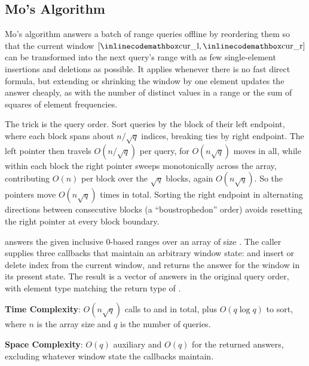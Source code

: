 \subsection{Mo's Algorithm}
\label{sec:2.5.4}
Mo's algorithm answers a batch of range queries offline by reordering them so that the current window $[{\inlinecodemath{cur\_l}}, {\inlinecodemath{cur\_r}}]$ can be transformed into the next query's range with as few single-element insertions and deletions as possible. It applies whenever there is no fast direct formula, but extending or shrinking the window by one element updates the answer cheaply, as with the number of distinct values in a range or the sum of squares of element frequencies.

The trick is the query order. Sort queries by the block of their left endpoint, where each block spans about $n / \sqrt{q}$ indices, breaking ties by right endpoint. The left pointer then travels $O(n / \sqrt{q})$ per query, for $O(n \sqrt{q})$ moves in all, while within each block the right pointer sweeps monotonically across the array, contributing $O(n)$ per block over the $\sqrt{q}$ blocks, again $O(n \sqrt{q})$. So the pointers move $O(n \sqrt{q})$ times in total. Sorting the right endpoint in alternating directions between consecutive blocks (a ``boustrophedon'' order) avoids resetting the right pointer at every block boundary.

\begin{compactitem}
  \item {} answers the given inclusive 0-based ranges over an array of size . The caller supplies three callbacks that maintain an arbitrary window state:  and  insert or delete index  from the current window, and  returns the answer for the window in its present state. The result is a vector of answers in the original query order, with element type matching the return type of .
\end{compactitem}

\textbf{Time Complexity}: $O(n \sqrt{q})$ calls to  and  in total, plus $O(q \log q)$ to sort, where $n$ is the array size and $q$ is the number of queries.

\textbf{Space Complexity}: $O(q)$ auxiliary and $O(q)$ for the returned answers, excluding whatever window state the callbacks maintain.


